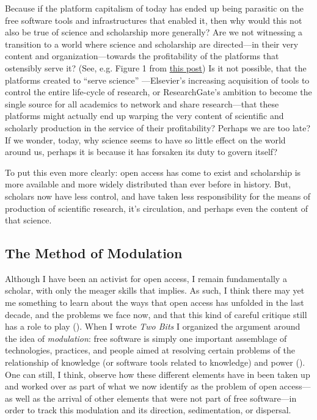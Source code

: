 \documentclass[11pt]{article}
\begin{document}
Because if the platform capitalism of today has ended up being parasitic on the free software tools and infrastructures that enabled it, then why would this not also be true of science and scholarship more generally?  Are we not witnessing a transition to a world where science and scholarship are directed---in their very content and organization---towards the profitability of the platforms that ostensibly serve it? (See, e.g. Figure 1 from \href{http://knowledgegap.org/index.php/sub-projects/rent-seeking-and-financialization-of-the-academic-publishing-industry/preliminary-findings/}{this post})  Is it not possible, that the platforms created to ``serve science'' ---Elsevier's increasing acquisition of tools to control the entire life-cycle of research, or ResearchGate's ambition to become the single source for all academics to network and share research---that these platforms might actually end up warping the very content of scientific and scholarly production in the service of their profitability?  Perhaps we are too late?  If we wonder, today, why science seems to have so little effect on the world around us, perhaps it is because it has forsaken its duty to govern itself?

To put this even more clearly: open access has come to exist and scholarship is more available and more widely distributed than ever before in history.  But, scholars now have less control, and have taken less responsibility for the means of production of scientific research, it's circulation, and perhaps even the content of that science.  

\subsection*{The Method of Modulation}
\label{sec:org5a4a875}

Although I have been an activist for open access, I remain fundamentally a scholar, with only the meager skills that implies. As such, I think there may yet me something to learn about the ways that open access has unfolded in the last decade, and the problems we face now, and that this kind of careful critique still has a role to play (\cite{foucault1997critique,folkers2015darintrut}).  When I wrote \emph{Two Bits} I organized the argument around the idea of \emph{modulation}: free software is simply one important assemblage of technologies, practices, and people aimed at resolving certain problems of the relationship of knowledge (or software tools related to knowledge) and power (\cite{hacking2004histontol,rabinow2003anthtoday}).  One can still, I think, observe how these different elements have in been taken up and worked over as part of what we now identify as the problem of open access---as well as the arrival of other elements that were not part of free software---in order to track this modulation and its direction, sedimentation, or dispersal.
\end{document}
